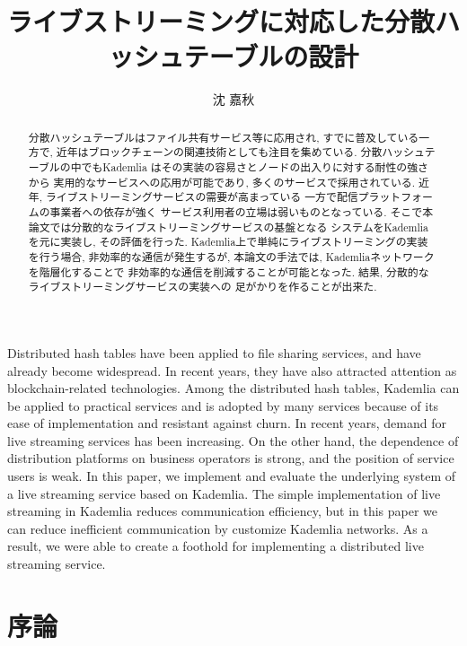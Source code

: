 \documentclass[sotsuron]{jcsie}
\title{ライブストリーミングに対応した分散ハッシュテーブルの設計}
\author{沈 嘉秋}
\begin{document}
\maketitle
\emaketitle
{}
\begin{abstract}    
分散ハッシュテーブルはファイル共有サービス等に応用され, 
すでに普及している一方で, 
近年はブロックチェーンの関連技術としても注目を集めている.
%
分散ハッシュテーブルの中でもKademlia
はその実装の容易さとノードの出入りに対する耐性の強さから
実用的なサービスへの応用が可能であり, 
多くのサービスで採用されている.
%
近年, ライブストリーミングサービスの需要が高まっている
一方で配信プラットフォームの事業者への依存が強く
サービス利用者の立場は弱いものとなっている.
そこで本論文では分散的なライブストリーミングサービスの基盤となる
システムをKademliaを元に実装し, その評価を行った.
%
Kademlia上で単純にライブストリーミングの実装を行う場合, 
非効率的な通信が発生するが, 本論文の手法では, 
Kademliaネットワークを階層化することで
非効率的な通信を削減することが可能となった.
%
結果, 分散的なライブストリーミングサービスの実装への
足がかりを作ることが出来た.
\end{abstract}
\begin{eabstract}
Distributed hash tables have been applied to file sharing services, 
and have already become widespread.
In recent years, they have also attracted attention as 
blockchain-related technologies.
%
Among the distributed hash tables, 
Kademlia can be applied to practical services 
and is adopted by many services 
because of its ease of implementation and resistant against churn.
%
In recent years, demand for live streaming services has been increasing.
On the other hand,
the dependence of distribution platforms on business operators is strong, 
and the position of service users is weak.
%
In this paper, we implement and evaluate the underlying system 
of a live streaming service based on Kademlia.
%
The simple implementation of live streaming in 
Kademlia reduces communication efficiency, 
but in this paper we can reduce inefficient communication by 
customize Kademlia networks.
%
As a result, we were able to create a foothold for implementing 
a distributed live streaming service.
\end{eabstract}
\setcounter{tocdepth}{2}
\tableofcontents
{}


\chapter{序論}
\end{document}
